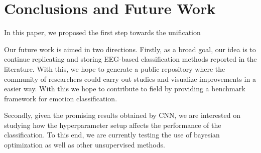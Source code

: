 \documentclass{sig-alternate}
\begin{document}
\section{Conclusions and  Future Work}
\label{conclusion}

In this paper, we proposed the first step towards the unification 


Our future work is aimed in two directions. Firstly, as a broad
goal, our idea is to continue replicating and  storing EEG-based 
classification methods reported in the literature. With this, we hope
to generate a public repository where the community of researchers
could carry out studies and visualize improvements in  a easier way. 
With this we hope to contribute to field by providing a benchmark
framework for emotion classification.

Secondly, given the promising results obtained by CNN, we are
interested on studying how the hyperparameter setup affects the 
performance of the classification. To this end, we are currently testing
the use of bayesian optimization as well as other unsupervised methods.



%

%
%
\end{document}
